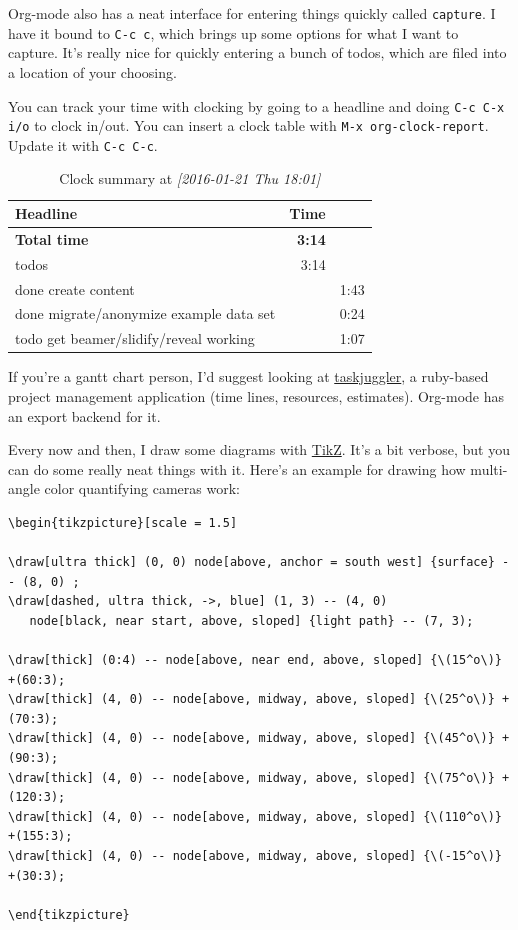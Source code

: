 \documentclass[11pt]{article}
\begin{document}
Org-mode also has a neat interface for entering things quickly called \texttt{capture}. I have it
bound to \texttt{C-c c}, which brings up some options for what I want to capture. It's really
nice for quickly entering a bunch of todos, which are filed into a location of your
choosing.

You can track your time with clocking by going to a headline and doing \texttt{C-c C-x i/o} to
clock in/out. You can insert a clock table with \texttt{M-x org-clock-report}. Update it with
\texttt{C-c C-c}.

\begin{table}[htb]
\caption{Clock summary at \textit{[2016-01-21 Thu 18:01]}}
\centering
\begin{tabular}{lrr}
\toprule
Headline & Time & \\
\midrule
\textbf{Total time} & \textbf{3:14} & \\
\midrule
todos & 3:14 & \\
\hspace*{1.0em}done create content &  & 1:43\\
\hspace*{1.0em}done migrate/anonymize example data set &  & 0:24\\
\hspace*{1.0em}todo get beamer/slidify/reveal working &  & 1:07\\
\bottomrule
\end{tabular}
\end{table}

If you're a gantt chart person, I'd suggest looking at \href{http://www.taskjuggler.org/}{taskjuggler}, a ruby-based project
management application (time lines, resources, estimates). Org-mode has an export backend
for it.

Every now and then, I draw some diagrams with \href{http://www.texample.net/tikz/examples/}{TikZ}. It's a bit verbose, but you can do
some really neat things with it. Here's an example for drawing how multi-angle color quantifying cameras work:

\begin{verbatim}
\begin{tikzpicture}[scale = 1.5]

\draw[ultra thick] (0, 0) node[above, anchor = south west] {surface} -- (8, 0) ;
\draw[dashed, ultra thick, ->, blue] (1, 3) -- (4, 0)
   node[black, near start, above, sloped] {light path} -- (7, 3);

\draw[thick] (0:4) -- node[above, near end, above, sloped] {\(15^o\)} +(60:3);
\draw[thick] (4, 0) -- node[above, midway, above, sloped] {\(25^o\)} +(70:3);
\draw[thick] (4, 0) -- node[above, midway, above, sloped] {\(45^o\)} +(90:3);
\draw[thick] (4, 0) -- node[above, midway, above, sloped] {\(75^o\)} +(120:3);
\draw[thick] (4, 0) -- node[above, midway, above, sloped] {\(110^o\)} +(155:3);
\draw[thick] (4, 0) -- node[above, midway, above, sloped] {\(-15^o\)} +(30:3);

\end{tikzpicture}
\end{verbatim}
\end{document}
